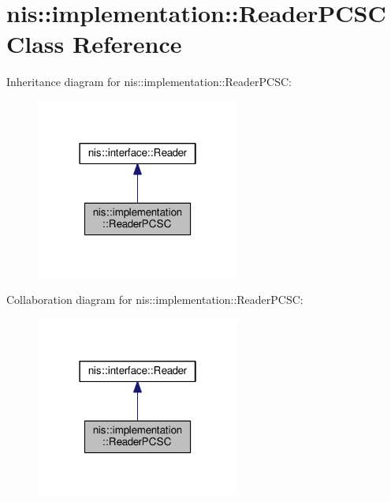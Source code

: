 \hypertarget{classnis_1_1implementation_1_1ReaderPCSC}{\section{nis\-:\-:implementation\-:\-:Reader\-P\-C\-S\-C Class Reference}
\label{classnis_1_1implementation_1_1ReaderPCSC}
}


Inheritance diagram for nis\-:\-:implementation\-:\-:Reader\-P\-C\-S\-C\-:
\nopagebreak
\begin{figure}[H]
\begin{center}
\leavevmode
\includegraphics[width=190pt]{classnis_1_1implementation_1_1ReaderPCSC__inherit__graph}
\end{center}
\end{figure}


Collaboration diagram for nis\-:\-:implementation\-:\-:Reader\-P\-C\-S\-C\-:
\nopagebreak
\begin{figure}[H]
\begin{center}
\leavevmode
\includegraphics[width=190pt]{classnis_1_1implementation_1_1ReaderPCSC__coll__graph}
\end{center}
\end{figure}
